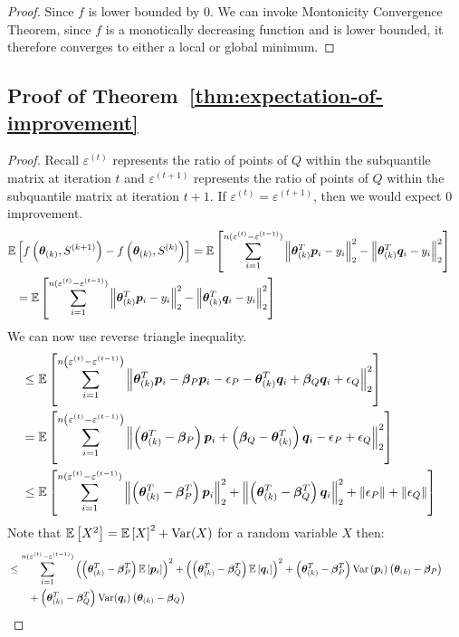 \documentclass{article} %
\newcommand{\norm}[1]{\left\lVert#1\right\rVert}
\begin{document}
\begin{appendices}
\begin{proof}
	Since $f$ is lower bounded by $0$. We can invoke Montonicity Convergence Theorem, since $f$ is a monotically decreasing function and is lower bounded, it therefore converges to either a local or global minimum. 
	\end{proof}
	
	\subsection{Proof of Theorem~\ref{thm:expectation-of-improvement}}
	\begin{proof}
	Recall $\varepsilon^{(t)}$ represents the ratio of points of $Q$ within the subquantile matrix at iteration $t$ and $\varepsilon^{(t+1)}$ represents the ratio of points of $Q$ within the subquantile matrix at iteration $t+1$. If $\varepsilon^{(t)} = \varepsilon^{(t+1)}$, then we would expect $0$ improvement.
	\begin{align*}
		\mathbb{E}&\left[f\left(\vtheta_{(k)}, S^{(k+1)}\right) - f\left(\vtheta_{(k)}, S^{(k)}\right)\right] = \mathbb{E}\left[\sum_{i=1}^{n(\varepsilon^{(t)}-\varepsilon^{(t-1)})}\norm{\vtheta_{(k)}^T\vp_i -y_i}_2^2 - \norm{\vtheta_{(k)}^T\vq_i - y_i}_2^2\right] &&\\
		&= \mathbb{E}\left[\sum_{i=1}^{n(\varepsilon^{(t)}-\varepsilon^{(t-1)})}\norm{\vtheta_{(k)}^T\vp_i -y_i}_2^2 - \norm{\vtheta_{(k)}^T\vq_i - y_i}_2^2\right] &&
	\end{align*}
	We can now use reverse triangle inequality.
	\begin{align*}
		&\leq  \mathbb{E}\left[\sum_{i=1}^{n\left(\varepsilon^{(t)}-\varepsilon^{(t-1)}\right)}\norm{\vtheta_{(k)}^T\vp_i - \vbeta_P\vp_i - \eps_P - \vtheta^T_{(k)}\vq_i + \vbeta_Q\vq_i + \eps_Q}_2^2 \right] &&\\
		&=  \mathbb{E}\left[\sum_{i=1}^{n\left(\varepsilon^{(t)}-\varepsilon^{(t-1)}\right)}\norm{\left(\vtheta^T_{(k)} - \vbeta_P\right)\vp_i + \left(\vbeta_Q - \vtheta^T_{(k)}\right)\vq_i - \eps_P+ \eps_Q}_2^2 \right] &&\\
		&\leq \mathbb{E}\left[\sum_{i=1}^{n(\varepsilon^{(t)} - \varepsilon^{(t-1)})}\norm{\left(\vtheta_{(k)}^T - \vbeta_P^T\right)\vp_i}_2^2 + \norm{\left(\vtheta_{(k)}^T - \vbeta_Q^T\right)\vq_i}_2^2 + \norm{\eps_P} + \norm{\eps_Q}\right]
	\end{align*}
	Note that $\mathbb{E}\left[X^2\right] = \mathbb{E}\left[X\right]^2 + \mathrm{Var}(X)$ for a random variable $X$ then:
	\begin{align*}
		&\leq \sum_{i=1}^{n(\varepsilon^{(t)} - \varepsilon^{(t-1)})} \left(\left(\vtheta_{(k)}^T - \vbeta_P^T\right)\mathbb{E}\left[\vp_i\right]\right)^2 + \left(\left(\vtheta_{(k)}^T - \vbeta_Q^T\right)\mathbb{E}\left[\vq_i\right]\right)^2 + \left(\vtheta_{(k)}^T - \vbeta_P^T\right)\Var\left(\vp_i\right)\left(\vtheta_{(k)} - \vbeta_P\right) \notag\\ &\qquad+ \left(\vtheta_{(k)}^T - \vbeta_Q^T\right)\Var(\vq_i)\left(\vtheta_{(k)} - \vbeta_Q\right) &&\\

\end{align*}
\end{proof}
\end{appendices}
\end{document}
